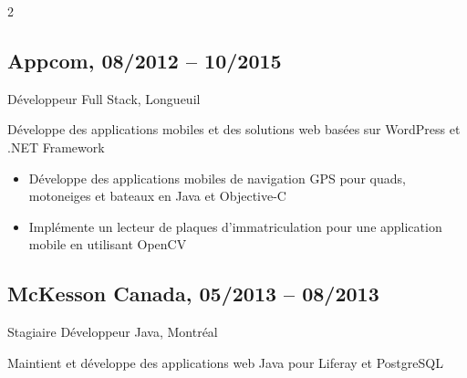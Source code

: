 \documentclass{article}
\begin{document}
\begin{paracol}{2}
\begin{rightcolumn}
    \subsection{Appcom, 08/2012 -- 10/2015}  
    {Développeur Full Stack, Longueuil\par}  
    {  
      Développe des applications mobiles et des solutions web basées sur WordPress et .NET Framework
    \par}  
    \begin{itemize}  
      \item Développe des applications mobiles de navigation GPS pour quads, motoneiges et bateaux en Java et Objective-C  
      \item Implémente un lecteur de plaques d’immatriculation pour une application mobile en utilisant OpenCV  
    \end{itemize}  

    \vspace{1em}  

    \subsection{McKesson Canada, 05/2013 -- 08/2013}  
    {Stagiaire Développeur Java, Montréal\par}  
    {  
      Maintient et développe des applications web Java pour Liferay et PostgreSQL  
    \par}  
    
    \flushpage

  \end{rightcolumn}
\end{paracol}
\end{document}
